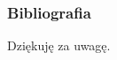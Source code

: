 \begin{frame}[t]
	\frametitle{Bibliografia}
	\nocite{*}
	
	
	
	\centering
	\vspace{20mm}
	Dziękuję za uwagę.
\end{frame}